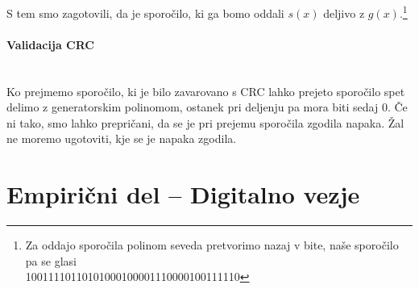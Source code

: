 \documentclass[12pt]{article}
\begin{document}
            S tem smo zagotovili, da je sporočilo, ki ga bomo oddali $s(x)$ 
            deljivo z $g(x)$.\footnote{Za oddajo sporočila polinom seveda 
            pretvorimo nazaj v bite, naše sporočilo pa se glasi\\ 
            10011110110101000100001110000100111110}
            
            \paragraph{Validacija CRC} \mbox{}\\
            Ko prejmemo sporočilo, ki je bilo zavarovano s CRC lahko prejeto 
            sporočilo spet delimo z generatorskim polinomom, ostanek pri 
            deljenju pa mora biti sedaj 0. Če ni tako, smo lahko prepričani,
            da se je pri prejemu sporočila zgodila napaka. Žal ne moremo 
            ugotoviti, kje se je napaka zgodila.

\newpage
\section{Empirični del – Digitalno vezje}
\end{document}

